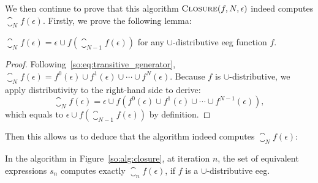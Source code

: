 We then continue to prove that this algorithm $\textsc{Closure}(f, N,
\epsilon)$ indeed computes $\closure_N f(\epsilon)$.  Firstly, we prove the
following lemma:
\begin{lemma}
    $\closure_N f(\epsilon) = \epsilon \cup f \left( \closure_{N-1} f(\epsilon)
    \right)$ for any $\cup$-distributive \gls{eeg} function $f$.
    {}\label{so:lem:transitive}
\end{lemma}
\begin{proof}
    Following~\eqref{so:eq:transitive_generator}, $\closure_N f(\epsilon) =
    f^0(\epsilon) \cup f^1(\epsilon) \cup \cdots \cup f^N(\epsilon)$.  Because
    $f$ is $\cup$-distributive, we apply distributivity to the right-hand side
    to derive:
    \begin{equation}
        \closure_N f(\epsilon) = \epsilon \cup f\left(
            f^0(\epsilon) \cup f^1(\epsilon) \cup \cdots \cup f^{N-1}(\epsilon)
        \right),
    \end{equation}
    which equals to $\epsilon \cup f\left( \closure_{N-1} f(\epsilon) \right)$
    by definition.
\end{proof}
Then this allows us to deduce that the algorithm indeed computes $\closure_N
f(\epsilon)$:
\begin{theorem}
    In the algorithm in Figure~\ref{so:alg:closure}, at iteration $n$, the set
    of equivalent expressions $s_n$ computes exactly $\closure_n f(\epsilon)$,
    if $f$ is a $\cup$-distributive \gls{eeg}\@.
    \label{so:thm:closure}
\end{theorem}
